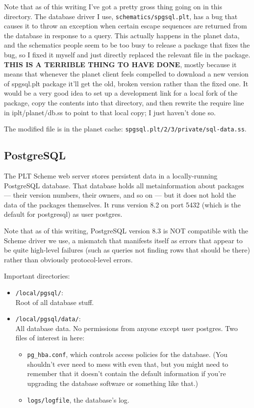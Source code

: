 \documentclass{article}
\begin{document}
Note that as of this writing I've got a pretty gross thing going on in
this directory. The database driver I use, \texttt{schematics/spgsql.plt}, has
a bug that causes it to throw an exception when certain escape
sequences are returned from the database in response to a query. This
actually happens in the planet data, and the schematics people seem to
be too busy to release a package that fixes the bug, so I fixed it
myself and just directly replaced the relevant file in the
package. \textbf{THIS IS A TERRIBLE THING TO HAVE DONE}, mostly because it
means that whenever the planet client feels compelled to download a
new version of spgsql.plt package it'll get the old, broken version
rather than the fixed one. It would be a very good idea to set up a
development link for a local fork of the package, copy the contents
into that directory, and then rewrite the require line in
iplt/planet/db.ss to point to that local copy; I just haven't done
so.

The modified file is in the planet cache:
\texttt{spgsql.plt/2/3/private/sql-data.ss}.

\subsection{PostgreSQL}

The PLT Scheme web server stores persistent data in a locally-running
PostgreSQL database. That database holds all metainformation about
packages --- their version numbers, their owners, and so on --- but it
does not hold the data of the packages themselves. It runs version 8.2
on port 5432 (which is the default for postgresql) as user
postgres. 

Note that as of this writing, PostgreSQL version 8.3 is NOT compatible
with the Scheme driver we use, a mismatch that manifests itself as
errors that appear to be quite high-level failures (such as queries
not finding rows that should be there) rather than obviously
protocol-level errors.

Important directories: 
\begin{itemize}
\item \texttt{/local/pgsql/}: \\
Root of all database stuff.

\item \texttt{/local/pgsql/data/}: \\
All database data. No permissions from anyone
except user postgres. Two files of interest in here:
\begin{itemize}
  \item \texttt{pg\_hba.conf}, which controls access policies for
  the database. (You shouldn't ever need to mess with even that, but
  you might need to remember that it doesn't contain the default
  information if you're upgrading the database software or something
  like that.)
  \item \texttt{logs/logfile}, the database's log. 
\end{itemize}
\end{itemize}
\end{document}
